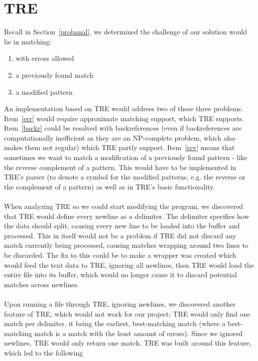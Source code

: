 \section{TRE}\label{tre}
Recall in Section~\ref{probanal}, we determined the challenge of our 
solution would lie in matching:
\begin{enumerate}
\item \label{err} with errors allowed
\item \label{backr} a previously found match 
\item \label{rev} a modified pattern
\end{enumerate}
An implementation based on TRE would address two of these three 
problems. Item~\ref{err} would require approximate matching support, which 
TRE supports. Item~\ref{backr} could be resolved 
with backreferences (even if backreferences are computationally inefficient as 
they are an NP-complete problem, which also makes them not regular) 
which TRE partly support. Item~\ref{rev} means that sometimes we want to 
match a modification of a previously found pattern - like the reverse 
complement of a pattern. This would have to be implemented in TRE's parser 
(to denote a symbol for the modified patterns, e.g. the reverse or the 
complement of a pattern) as 
well as in TRE's basic functionality.\\\\
When analyzing TRE so we could start modifying the 
program, we discovered that TRE would define every newline as a delimiter. The 
delimiter specifies how the data should split, causing every new line 
to be loaded into the buffer and processed. This in 
itself would not be a problem if TRE did not discard any match currently being 
processed, causing matches wrapping around two 
lines to be discarded. The fix to this could be to make a wrapper 
was created which would feed the text data to TRE, 
ignoring all newlines, then TRE would load the entire file into its buffer, 
which would no longer cause it to discard potential matches across newlines.\\\\
Upon running a file through TRE, ignoring newlines, we discovered 
another feature of TRE, which would not work for our project; TRE would only 
find one match per delimiter, it being the earliest, best-matching match (where a 
best-matching match is a match with the least amount of errors). Since we ignored 
newlines, TRE would only 
return one match. TRE was built around this feature, which led to the following 
